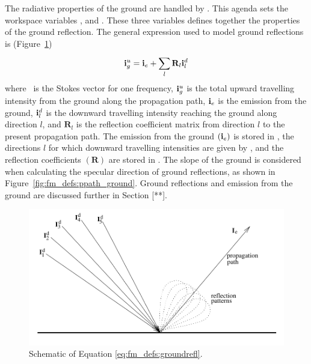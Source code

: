 \label{sec:fm_defs:groundrefl}

The radiative properties of the ground are handled by
. This agenda sets the workspace
variables ,  and
. These three variables defines
together the properties of the ground reflection. The general
expression used to model ground reflections is
(Figure~\ref{fig:fm_defs:ground_refl})
\begin{equation}
  \mathbf{i}_g^u = \mathbf{i}_e + \sum_l^{} \mathbf{R}_l \mathbf{i}_l^d
  \label{eq:fm_defs:groundrefl}
\end{equation}
where \MpiVct\ is the Stokes vector for one frequency, $\mathbf{i}_g^u$
is the total upward travelling intensity from the ground along the
propagation path, $\mathbf{i}_e$ is the emission from the ground,
$\mathbf{i}_l^d$ is the downward travelling intensity reaching the ground
along direction $l$, and $\mathbf{R}_l$ is the reflection coefficient
matrix from direction $l$ to the present propagation path. The
emission from the ground $(\mathbf{i}_e)$ is stored in
, the directions $l$ for which downward
travelling intensities are given by , and the
reflection coefficients $(\mathbf{R})$ are stored in
. The slope of the ground is
considered when calculating the specular direction of ground
reflections, as shown in Figure~\ref{fig:fm_defs:ppath_ground}.
Ground reflections and emission from the ground are discussed further
in Section [**].

\begin{figure}[!p]
 \begin{center}
  \includegraphics*[width=0.95\hsize]{Figs/fm_definitions/ground_refl}
  \caption{Schematic of Equation \ref{eq:fm_defs:groundrefl}.}
  \label{fig:fm_defs:ground_refl}
 \end{center}
\end{figure}

